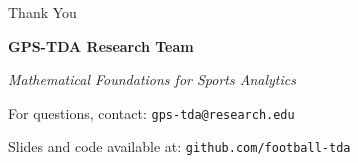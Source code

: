 \documentclass[aspectratio=169]{beamer}
\begin{document}
\begin{frame}
\centering
\vspace{2cm}
{\Huge Thank You}
\vspace{1cm}

\textbf{GPS-TDA Research Team}

\vspace{0.5cm}
\textit{Mathematical Foundations for Sports Analytics}

\vspace{1cm}
\small
For questions, contact: \texttt{gps-tda@research.edu}

\vspace{0.5cm}
\small
Slides and code available at: \texttt{github.com/football-tda}
\end{frame}
\end{document}
